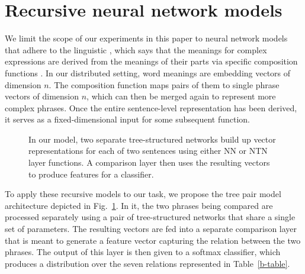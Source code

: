 
\section{Recursive neural network models} \label{methods}

We limit the scope of our experiments in this paper to neural network models 
that adhere to the linguistic , which says that the meanings for complex
expressions are derived from the meanings of their parts
via specific composition functions \cite{Partee84,Janssen97}. In our
distributed setting, word meanings are embedding vectors of dimension $n$. The
composition function maps pairs of them to single phrase vectors of dimension $n$, 
which can then be merged again to represent more complex
phrases. Once the entire sentence-level representation has been
derived, it serves as a fixed-dimensional input for some subsequent function.

\begin{figure}[tp]
  \centering
  
  \caption{In our model, two separate tree-structured networks build up vector representations for each of two sentences using either NN or NTN layer functions. A comparison layer then uses the resulting vectors to produce features for a classifier.} 
  \label{sample-figure}
\end{figure}

To apply these recursive models to our task, we propose the tree 
pair model architecture depicted in Fig.~\ref{sample-figure}. 
In it, the two phrases being compared are processed separately using a pair 
of tree-structured networks that share a single set of parameters. 
The resulting vectors are fed into a separate comparison
layer that is meant to generate a feature vector capturing the
relation between the two phrases. The output of this layer is then
given to a softmax classifier, which produces a
distribution over the seven relations represented in Table~\ref{b-table}.

